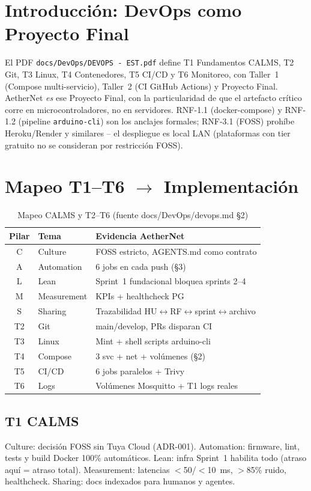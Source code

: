 \documentclass[conference]{IEEEtran}
\begin{document}
\section{Introducción: DevOps como Proyecto Final}
El PDF \texttt{docs/DevOps/DEVOPS - EST.pdf} define T1 Fundamentos CALMS, T2 Git, T3 Linux, T4 Contenedores, T5 CI/CD y T6 Monitoreo, con Taller~1 (Compose multi-servicio), Taller~2 (CI GitHub Actions) y Proyecto Final. AetherNet \emph{es} ese Proyecto Final, con la particularidad de que el artefacto crítico corre en microcontroladores, no en servidores. RNF-1.1 (docker-compose) y RNF-1.2 (pipeline \texttt{arduino-cli}) son los anclajes formales; RNF-3.1 (FOSS) prohíbe Heroku/Render y similares -- el despliegue es local LAN (plataformas con tier gratuito no se consideran por restricción FOSS).

\section{Mapeo T1--T6 $\rightarrow$ Implementación}
\begin{table}[t]
\centering
\caption{Mapeo CALMS y T2--T6 (fuente docs/DevOps/devops.md \S2)}
\label{tab:calms}
\begin{tabular}{@{}clp{4.2cm}@{}}
\toprule
Pilar & Tema & Evidencia AetherNet \\
\midrule
C & Culture & FOSS estricto, AGENTS.md como contrato \\
A & Automation & 6 jobs en cada push (\S3) \\
L & Lean & Sprint~1 fundacional bloquea sprints 2--4 \\
M & Measurement & KPIs + healthcheck PG \\
S & Sharing & Trazabilidad HU$\leftrightarrow$RF$\leftrightarrow$sprint$\leftrightarrow$archivo \\
\midrule
T2 & Git & main/develop, PRs disparan CI \\
T3 & Linux & Mint + shell scripts arduino-cli \\
T4 & Compose & 3 svc + net + volúmenes (\S2) \\
T5 & CI/CD & 6 jobs paralelos + Trivy \\
T6 & Logs & Volúmenes Mosquitto + T1 logs reales \\
\bottomrule
\end{tabular}
\end{table}

\subsection{T1 CALMS}
Culture: decisión FOSS sin Tuya Cloud (ADR-001). Automation: firmware, lint, tests y build Docker 100\% automáticos. Lean: infra Sprint~1 habilita todo (atraso aquí = atraso total). Measurement: latencias $<$50/$<$10~ms, $>$85\% ruido, healthcheck. Sharing: docs indexados para humanos y agentes.
\end{document}
